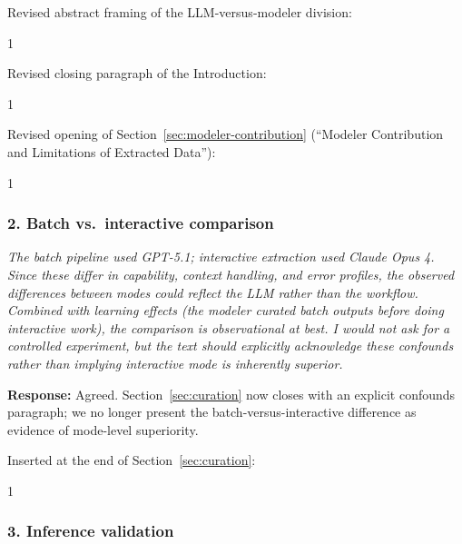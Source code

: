 \documentclass[11pt]{article}
\newcommand{\reviewer}[1]{\textcolor{reviewercolor}{\textit{#1}}}
\newcommand{\response}[1]{\textcolor{responsecolor}{\textbf{Response:} #1}}
\providecommand{\trackchanges}{1}
\newenvironment{revised}{\if1\trackchanges\color{blue}\fi}{}
\begin{document}
\medskip

Revised abstract framing of the LLM-versus-modeler division:

\begin{revised}

\end{revised}

\medskip

Revised closing paragraph of the Introduction:

\begin{revised}

\end{revised}

\medskip

Revised opening of Section~\ref{sec:modeler-contribution} (``Modeler Contribution and Limitations of Extracted Data''):

\begin{revised}

\end{revised}

\bigskip

\subsubsection*{2. Batch vs.\ interactive comparison}

\reviewer{The batch pipeline used GPT-5.1; interactive extraction used Claude Opus 4. Since these differ in capability, context handling, and error profiles, the observed differences between modes could reflect the LLM rather than the workflow. Combined with learning effects (the modeler curated batch outputs before doing interactive work), the comparison is observational at best. I would not ask for a controlled experiment, but the text should explicitly acknowledge these confounds rather than implying interactive mode is inherently superior.}

\response{Agreed. Section~\ref{sec:curation} now closes with an explicit confounds paragraph; we no longer present the batch-versus-interactive difference as evidence of mode-level superiority.}

\medskip

Inserted at the end of Section~\ref{sec:curation}:

\begin{revised}

\end{revised}

\bigskip

\subsubsection*{3. Inference validation}
\end{document}
